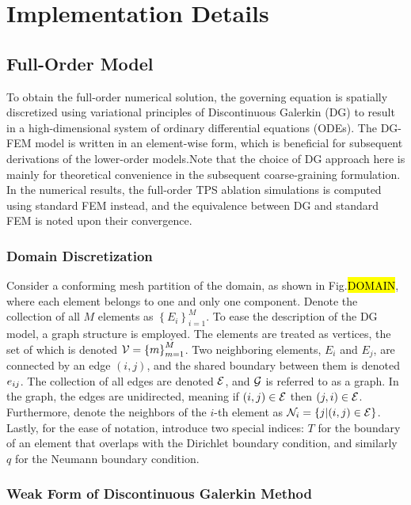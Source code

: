 \appendix

\section{Implementation Details}\label{appendix}

\subsection{Full-Order Model}

To obtain the full-order numerical solution, the governing equation is spatially discretized using variational principles of Discontinuous Galerkin (DG) to result in a high-dimensional system of ordinary differential equations (ODEs). The DG-FEM model is written in an element-wise form, which is beneficial for subsequent derivations of the lower-order models.Note that the choice of DG approach here is mainly for theoretical convenience in the subsequent coarse-graining formulation. In the numerical results, the full-order TPS ablation simulations is computed using standard FEM instead, and the equivalence between DG and standard FEM is noted upon their convergence.

\subsubsection{Domain Discretization}

Consider a conforming mesh partition of the domain, as shown in Fig.\hl{DOMAIN}, where each element belongs to one and only one component. Denote the collection of all $M$ elements as $\left\{E_i\right\}_{i=1}^{M}$. To ease the description of the DG model, a graph structure is employed. The elements are treated as vertices, the set of which is denoted $\mathcal{V}=\left\{m\right\}_{m=1}^{M}$. Two neighboring elements, $E_i$ and $E_j$, are connected by an edge $(i,j)$, and the shared boundary between them is denoted $e_{ij}$. The collection of all edges are denoted $\mathcal{E}$, and $\mathcal{G}$ is referred to as a graph. In the graph, the edges are unidirected, meaning if $(i,j)\in\mathcal{E}$ then $(j,i)\in\mathcal{E}$. Furthermore, denote the neighbors of the $i$-th element as $\mathcal{N}_i=\left\{j | (i,j) \in\mathcal{E}\right\}$. Lastly, for the ease of notation, introduce two special indices: $T$ for the boundary of an element that overlaps with the Dirichlet boundary condition, and similarly $q$ for the Neumann boundary condition.

\subsubsection{Weak Form of Discontinuous Galerkin Method}

